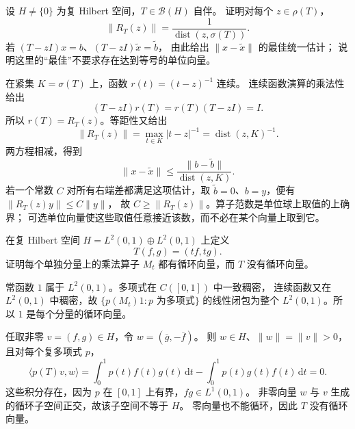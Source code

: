 \begin{optionalexercise}\label{b1:ex:29-sharp-resolvent}
设 \(H\ne\{0\}\) 为复 Hilbert 空间，\(T\in\mathcal B(H)\) 自伴。
证明对每个 \(z\in\rho(T)\)，
\[
 \|R_T(z)\|=\frac1{\operatorname{dist}(z,\sigma(T))}.
\]
若 \((T-zI)x=b\)、\((T-zI)\widetilde x=\widetilde b\)，
由此给出 \(\|x-\widetilde x\|\) 的最佳统一估计；
说明这里的“最佳”不要求存在达到等号的单位向量。
\end{optionalexercise}
\begin{solution}
在紧集 \(K=\sigma(T)\) 上，函数 \(r(t)=(t-z)^{-1}\) 连续。
连续函数演算的乘法性给出
\[
 (T-zI)r(T)=r(T)(T-zI)=I.
\]
所以 \(r(T)=R_T(z)\)。等距性又给出
\[
 \|R_T(z)\|=\max_{t\in K}|t-z|^{-1}
 =\operatorname{dist}(z,K)^{-1}.
\]
两方程相减，得到
\[
 \|x-\widetilde x\|
 \leq\frac{\|b-\widetilde b\|}{\operatorname{dist}(z,K)}.
\]
若一个常数 \(C\) 对所有右端差都满足这项估计，取
\(\widetilde b=0\)、\(b=y\)，便有 \(\|R_T(z)y\|\leq C\|y\|\)，
故 \(C\geq\|R_T(z)\|\)。算子范数是单位球上取值的上确界；
可选单位向量使这些取值任意接近该数，而不必在某个向量上取到它。
\end{solution}

\begin{optionalexercise}\label{b1:ex:29-cyclic-multiplicity}
在复 Hilbert 空间 \(H=L^2(0,1)\oplus L^2(0,1)\) 上定义
\[
 T(f,g)=(tf,tg).
\]
证明每个单独分量上的乘法算子 \(M_t\) 都有循环向量，而 \(T\) 没有循环向量。
\end{optionalexercise}
\begin{solution}
常函数 \(1\) 属于 \(L^2(0,1)\)。多项式在 \(C([0,1])\) 中一致稠密，
连续函数又在 \(L^2(0,1)\) 中稠密，故 \(\{p(M_t)1:p\text{ 为多项式}\}\)
的线性闭包为整个 \(L^2(0,1)\)。所以 \(1\) 是每个分量的循环向量。

任取非零 \(v=(f,g)\in H\)，令 \(w=(\overline g,-\overline f)\)。
则 \(w\in H\)、\(\|w\|=\|v\|>0\)，且对每个复多项式 \(p\)，
\[
 \langle p(T)v,w\rangle
 =\int_0^1 p(t)f(t)g(t)\,\mathrm dt
   -\int_0^1 p(t)g(t)f(t)\,\mathrm dt=0.
\]
这些积分存在，因为 \(p\) 在 \([0,1]\) 上有界，\(fg\in L^1(0,1)\)。
非零向量 \(w\) 与 \(v\) 生成的循环子空间正交，故该子空间不等于 \(H\)。
零向量也不能循环，因此 \(T\) 没有循环向量。
\end{solution}

